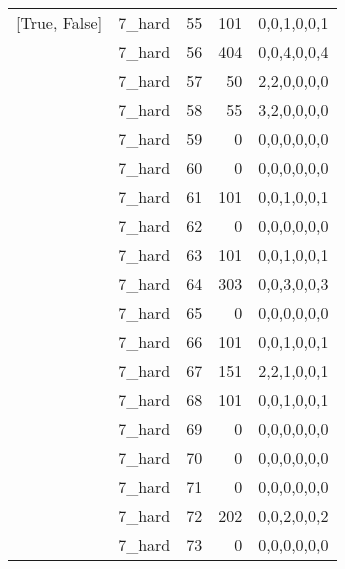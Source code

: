 \begin{tabular}{llrrl}
 [True, False]   & 7\_hard              &            55 &                   101 & 0,0,1,0,0,1   \\
 [True, False]   & 7\_hard              &            56 &                   404 & 0,0,4,0,0,4   \\
 [True, False]   & 7\_hard              &            57 &                    50 & 2,2,0,0,0,0   \\
 [True, False]   & 7\_hard              &            58 &                    55 & 3,2,0,0,0,0   \\
 [True, False]   & 7\_hard              &            59 &                     0 & 0,0,0,0,0,0   \\
 [True, False]   & 7\_hard              &            60 &                     0 & 0,0,0,0,0,0   \\
 [True, False]   & 7\_hard              &            61 &                   101 & 0,0,1,0,0,1   \\
 [True, False]   & 7\_hard              &            62 &                     0 & 0,0,0,0,0,0   \\
 [True, False]   & 7\_hard              &            63 &                   101 & 0,0,1,0,0,1   \\
 [True, False]   & 7\_hard              &            64 &                   303 & 0,0,3,0,0,3   \\
 [True, False]   & 7\_hard              &            65 &                     0 & 0,0,0,0,0,0   \\
 [True, False]   & 7\_hard              &            66 &                   101 & 0,0,1,0,0,1   \\
 [True, False]   & 7\_hard              &            67 &                   151 & 2,2,1,0,0,1   \\
 [True, False]   & 7\_hard              &            68 &                   101 & 0,0,1,0,0,1   \\
 [True, False]   & 7\_hard              &            69 &                     0 & 0,0,0,0,0,0   \\
 [True, False]   & 7\_hard              &            70 &                     0 & 0,0,0,0,0,0   \\
 [True, False]   & 7\_hard              &            71 &                     0 & 0,0,0,0,0,0   \\
 [True, False]   & 7\_hard              &            72 &                   202 & 0,0,2,0,0,2   \\
 [True, False]   & 7\_hard              &            73 &                     0 & 0,0,0,0,0,0   \\

\end{tabular}
